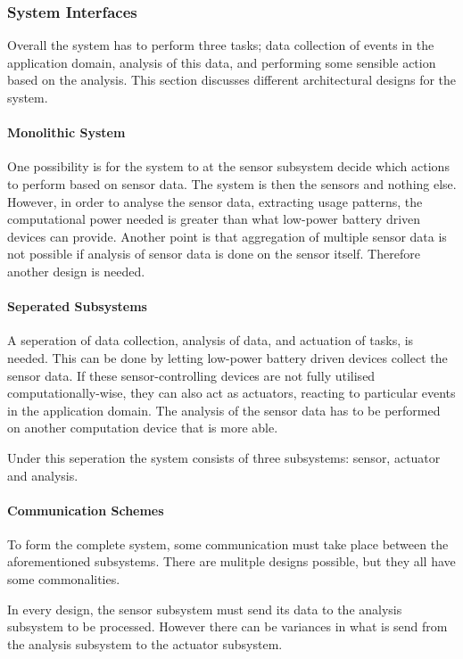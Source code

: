 \subsubsection{System Interfaces}

Overall the system has to perform three tasks; data collection of events in the
application domain, analysis of this data, and performing some sensible action
based on the analysis. This section discusses different architectural designs
for the system.

\paragraph{Monolithic System} One possibility is for the system to at the sensor
subsystem decide which actions to perform based on sensor data. The system is
then the sensors and nothing else. However, in order to analyse the sensor data,
extracting usage patterns, the computational power needed is greater than what
low-power battery driven devices can provide. Another point is that aggregation
of multiple sensor data is not possible if analysis of sensor data is done on
the sensor itself. Therefore another design is needed.

\paragraph{Seperated Subsystems} A seperation of data collection, analysis of
data, and actuation of tasks, is needed. This can be done by letting low-power
battery driven devices collect the sensor data. If these sensor-controlling
devices are not fully utilised computationally-wise, they can also act as
actuators, reacting to particular events in the application domain. The analysis
of the sensor data has to be performed on another computation device that is
more able.

Under this seperation the system consists of three subsystems: sensor, actuator
and analysis. 

\paragraph{Communication Schemes} To form the complete system, some
communication must take place between the aforementioned subsystems. There are
mulitple designs possible, but they all have some commonalities.

In every design, the sensor subsystem must send its data to the analysis
subsystem to be processed. However there can be variances in what is send from
the analysis subsystem to the actuator subsystem.

